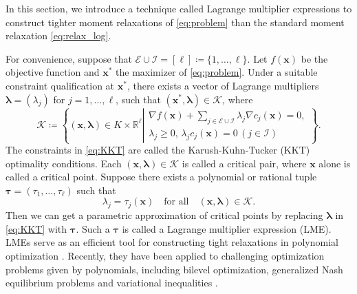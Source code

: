 \documentclass[pdflatex,sn-mathphys-num]{sn-jnl}%
\newcommand{\re}{\mathbb{R}}
\newcommand{\vect}[1]{\boldsymbol{#1}}
\newcommand{\ddd}{,\ldots,}
\theoremstyle{thmstyleone}%
\theoremstyle{thmstyletwo}%
\theoremstyle{thmstylethree}%
\begin{document}
In this section, we introduce a technique called Lagrange multiplier
expressions to construct tighter moment relaxations of
\eqref{eq:problem} than the standard moment relaxation
\eqref{eq:relax_log}.

For convenience, suppose that $\mathcal{E}\cup \mathcal{I} = [\ell] \coloneq \{1,\ldots, \ell\}$.
Let $f(\vect{x})$ be the objective function and $\vect{x}^*$ the maximizer of \eqref{eq:problem}.
Under a suitable constraint qualification at $\vect{x}^*$, there
exists a vector of Lagrange multipliers
$\vect{\lambda} = (\lambda_j)$ for $j = 1\ddd \ell$, 
such that $(\vect{x}^*,\vect{\lambda})\in\mathcal{K}$, where
\begin{equation}    \label{eq:KKT}
	\mathcal{K} \coloneqq 
	\left\{ (\vect{x}, \vect{\lambda})\in K\times \re^{\ell}
	\left|\begin{array}{c}
		\nabla f(\vect{x}) + \sum\limits_{j \in \mathcal{E} \cup \mathcal{I}} \lambda_j \nabla c_j(\vect{x}) = 0,\\
		\lambda_j\ge 0,\, \lambda_j c_j(\vect{x}) = 0\, (j \in \mathcal{I})
	\end{array}\right.\right\}.
\end{equation}
The constraints in \eqref{eq:KKT} are called the 
Karush-Kuhn-Tucker (KKT) optimality conditions.
Each $(\vect{x}, \vect{\lambda}) \in \mathcal{K}$ is called a critical pair, 
where $\vect{x}$ alone is called a critical point.
Suppose there exists a polynomial or rational tuple 
$\vect{\tau} = (\tau_1,\ldots, \tau_{\ell})$ such that 
\begin{equation}\label{eq:lme}
	\lambda_j = \tau_j(\vect{x})\quad \mbox{for all}\quad
	(\vect{x},\vect{\lambda})\in \mathcal{K}.
\end{equation}
Then we can get a parametric approximation of critical points by
replacing $\vect{\lambda}$ in \eqref{eq:KKT} with $\vect{\tau}$.
Such a $\vect{\tau}$ is called a Lagrange multiplier expression (LME).
LMEs serve as an efficient tool for constructing tight relaxations 
in polynomial optimization \cite{Nie2019}.
Recently, they have been applied to challenging optimization problems 
given by polynomials, including bilevel optimization, 
generalized Nash equilibrium problems and variational inequalities
\cite{Choi2024,NieSunTangZ,nie2023convex,NieTangZgnep21,NieWangZBilevel21}.
\end{document}
